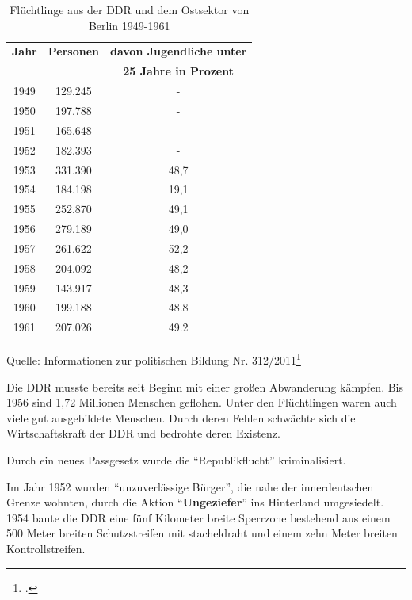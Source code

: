 \documentclass[12pt,a4paper]{article}
\begin{document}
\begin{table}[hh]
    \begin{center}
        \begin{tabular}{ c c c }
            \hline
            \hline
            \bf Jahr & \bf Personen & \bf davon Jugendliche unter \\
            & & \bf 25 Jahre in Prozent \\
            \hline
            1949 & 129.245 & - \\
            1950 & 197.788 & - \\
            1951 & 165.648 & - \\
            1952 & 182.393 & - \\
            1953 & 331.390 & 48,7 \\
            1954 & 184.198 & 19,1 \\
            1955 & 252.870 & 49,1 \\
            1956 & 279.189 & 49,0 \\
            1957 & 261.622 & 52,2 \\
            1958 & 204.092 & 48,2 \\
            1959 & 143.917 & 48,3 \\
            1960 & 199.188 & 48.8 \\
            1961 & 207.026 & 49.2 \\
            \hline
            \hline
        \end{tabular}
    \end{center}
    \caption{Flüchtlinge aus der DDR und dem Ostsektor von Berlin 1949-1961}
    Quelle: Informationen zur politischen Bildung Nr. 312/2011\footcite{izpb:ausbau-system}
\end{table}

Die DDR musste bereits seit Beginn mit einer großen Abwanderung kämpfen. Bis 1956 sind 1,72 Millionen Menschen geflohen. Unter den Flüchtlingen waren auch viele gut ausgebildete Menschen. Durch deren Fehlen schwächte sich die Wirtschaftskraft der DDR und bedrohte deren Existenz.

Durch ein neues Passgesetz wurde die \enquote{Republikflucht} kriminalisiert.

Im Jahr 1952 wurden \enquote{unzuverlässige Bürger}, die nahe der innerdeutschen Grenze wohnten, durch die Aktion \enquote{\textbf{Ungeziefer}} ins Hinterland umgesiedelt.
1954 baute die DDR eine fünf Kilometer breite Sperrzone bestehend aus einem 500 Meter breiten Schutzstreifen mit stacheldraht und einem zehn Meter breiten Kontrollstreifen.
\end{document}
